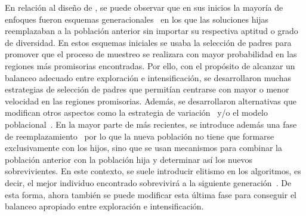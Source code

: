 En relación al diseño de \EAS{}, se puede observar que en sus inicios la mayoría de enfoques fueron esquemas generacionales~\cite{de2006evolutionary} en los 
que las soluciones hijas reemplazaban a la población anterior sin importar su respectiva aptitud o grado de diversidad.
%
En estos esquemas iniciales se usaba la selección de padres para promover que el proceso de muestreo se realizara con mayor probabilidad en las regiones más promisorias encontradas. 
%
Por ello, con el propósito de alcanzar un balanceo adecuado entre exploración e intensificación, se desarrollaron muchas estrategias de selección de padres
que permitían centrarse con mayor o menor velocidad en las regiones promisorias.
%
Además, se desarrollaron alternativas que modifican otros aspectos como la estrategia de variación~\cite{Joel:herrera2003fuzzy} y/o 
el modelo poblacional~\cite{alba2005parallel}.
%
En la mayor parte de \EAS{} más recientes, se introduce además una fase de reemplazamiento~\cite{eiben2003introduction} por lo que
la nueva población no tiene que formarse exclusivamente con los hijos,
sino que se usan mecanismos para combinar la población anterior con la población hija y determinar así los nuevos sobrevivientes.
%
En este contexto, se suele introducir elitismo en los algoritmos, es decir, el mejor individuo encontrado sobrevivirá a la siguiente generación~\cite{Joel:CHC}.
%
De esta forma, ahora también se puede modificar esta última fase para conseguir el balanceo apropiado entre exploración e intensificación.


